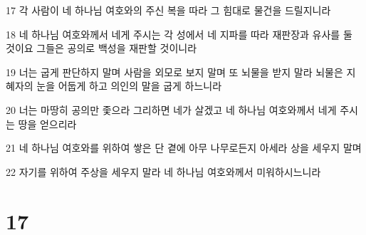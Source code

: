 \par 17 각 사람이 네 하나님 여호와의 주신 복을 따라 그 힘대로 물건을 드릴지니라
\par 18 네 하나님 여호와께서 네게 주시는 각 성에서 네 지파를 따라 재판장과 유사를 둘 것이요 그들은 공의로 백성을 재판할 것이니라
\par 19 너는 굽게 판단하지 말며 사람을 외모로 보지 말며 또 뇌물을 받지 말라 뇌물은 지혜자의 눈을 어둡게 하고 의인의 말을 굽게 하느니라
\par 20 너는 마땅히 공의만 좇으라 그리하면 네가 살겠고 네 하나님 여호와께서 네게 주시는 땅을 얻으리라
\par 21 네 하나님 여호와를 위하여 쌓은 단 곁에 아무 나무로든지 아세라 상을 세우지 말며
\par 22 자기를 위하여 주상을 세우지 말라 네 하나님 여호와께서 미워하시느니라

\chapter{17}

